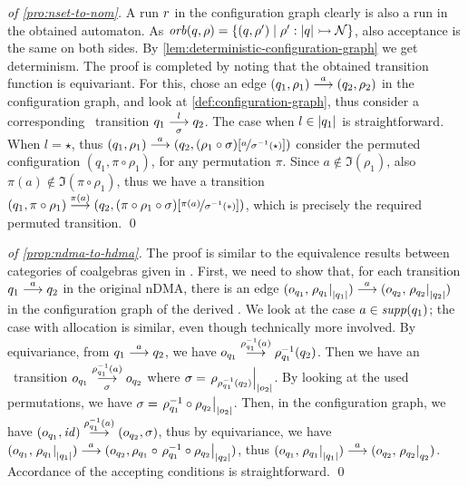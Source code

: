 \begin{proof}[of \cref{pro:nset-to-nom}]
 A run $r$ in the configuration graph clearly is also a run in the obtained automaton. As $\mathit{orb}(q,\rho) = \{(q,\rho')\mid \rho' : |q| \rightarrowtail \mathcal{N} \}$, also acceptance is the same on both sides. By \cref{lem:deterministic-configuration-graph} we get determinism. The proof is completed by noting that the obtained transition function is equivariant. For this, chose an edge $(q_1,\rho_1) \overset{a}{\longrightarrow} (q_2,\rho_2)$ in the configuration graph, and look at \cref{def:configuration-graph}, thus consider a corresponding \hdma\ transition $q_1 \overset{l}{\underset{\sigma}{\longrightarrow}} q_2$. The case when $l \in |q_1|$ is straightforward. When $l=\star$, thus $(q_1,\rho_1) \overset{a}{\longrightarrow} (q_2,(\rho_1 \circ \sigma)[\nicefrac{a}{\sigma^{-1}(\star)}])$ consider the permuted configuration $(q_1,\pi\circ\rho_1)$,  for any permutation $\pi$. Since $a \notin \Im(\rho_1)$, also  $\pi(a) \notin \Im (\pi\circ\rho_1)$, thus we have a transition $(q_1,\pi\circ\rho_1)\overset{\pi(a)}{\longrightarrow}(q_2,(\pi \circ \rho_1\circ \sigma)[\nicefrac{\pi(a)}{\sigma^{-1}(*)}])$, which is precisely the required permuted transition. \qed
\end{proof}

 
\begin{proof}[of \cref{prop:ndma-to-hdma}]
 The proof is similar to the equivalence results between categories of coalgebras given in \cite{CianciaM10}. First, we need to show that, for each transition $q_1 \overset{a}{\longrightarrow} q_2$ in the original nDMA, there is an edge $(o_{q_1},\left.\rho_{q_1}\right|_{|q_1|}) \overset{a}{\longrightarrow} (o_{q_2},\left.\rho_{q_2}\right|_{|q_2|})$ in the configuration graph of the derived \hdma. We look at the case $a \in \mathit{supp}(q_1)$; the case with allocation is similar, even though technically more involved. By equivariance, from $q_1 \overset{a}{\longrightarrow} q_2$, we have $o_{q_1} \overset{\rho^{-1}_{q_1} (a)}{\longrightarrow} \rho^{-1}_{q_1}(q_2)$. Then we have an \hdma\ transition $o_{q_1} \overset{\rho^{-1}_{q_1}(a)}{\underset{\sigma}{\longrightarrow}} o_{q_2}$ where $\sigma = \left.\rho_{\rho^{-1}_{q_1}(q_2)}\right|_{|o_2|}$. 
 By looking at the used permutations, we have $\sigma = \left.\rho^{-1}_{q_1} \circ \rho_{q_2}\right|_{|o_2|}$. 
 Then, in the configuration graph, we have $(o_{q_1},\mathit{id}) \overset{\rho^{-1}_{q_1}(a)}{\longrightarrow} (o_{q_2},\sigma)$, thus by equivariance, we have 
 $(o_{q_1},\left.\rho_{q_1}\right|_{|q_1|}) \overset{a}{\longrightarrow} (o_{q_2},\rho_{q_1} \circ 
 \left.\rho^{-1}_{q_1} \circ \rho_{q_2}\right|_{|q_2|})$, 
 thus $(o_{q_1},\left.\rho_{q_1}\right|_{|q_1|}) \overset{a}{\longrightarrow} (o_{q_2},\left.\rho_{q_2}\right|_{q_2})$. Accordance of the accepting conditions is straightforward.
 \qed
\end{proof}


